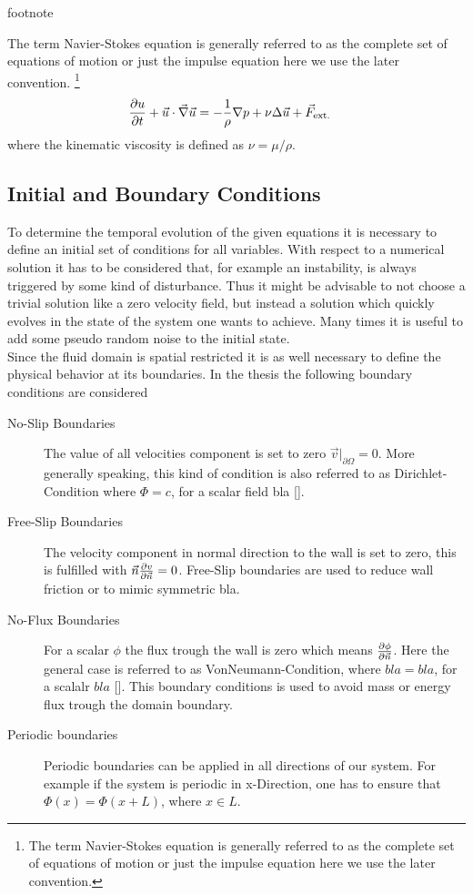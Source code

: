 footnote{The term Navier-Stokes equation is generally referred to as the complete set of equations of motion or
just the impulse equation here we use the later convention.
\footnote{The term Navier-Stokes equation is generally referred to as the complete set of equations of motion or
just the impulse equation here we use the later convention.}
\begin{align}
    \label{theorie:eqns}
    \pdn[u]{t} + \vec{u} \cdot \vec{\nabla} \vec{u} &= - \frac{1}{\rho} \nabla p + \nu \Delta \vec{u} + \vec{F}_{\text{ext.}}
\end{align}
where the kinematic viscosity is defined as $\nu = \mu/\rho$.


\subsection{Initial and Boundary Conditions}

To determine the temporal evolution of the given equations it is necessary to define an initial set of conditions for all variables.
With respect to a numerical solution it has to be considered that, for example an instability, is always triggered by some kind of disturbance.
Thus it might be advisable to not choose a trivial solution like a zero velocity field, but instead a solution which quickly evolves in the state
of the system one wants to achieve. Many times it is useful to add some pseudo random noise to the initial state.\\
Since the fluid domain is spatial restricted it is as well necessary to define the physical behavior at its boundaries.
In the thesis the following boundary conditions are considered


\begin{description}
    \item[No-Slip Boundaries] The value of all velocities component is set to zero $\vec{v}|_{\partial \Omega} = 0$.
                              More generally speaking, this kind of condition is  also referred to as Dirichlet-Condition where $\Phi=c $, for a scalar field bla [].
    \item[Free-Slip Boundaries] The velocity component in normal direction to the wall is set to zero, this is fulfilled with $\vec{n}\pdn[v]{\vec{n}} = 0$.
                                Free-Slip boundaries are used to reduce wall friction or to mimic symmetric bla.
    \item[No-Flux Boundaries] For a scalar $\phi$ the flux trough the wall is zero which means $\pdn[\phi]{\vec{n}}$.
                              Here the general case is referred to as VonNeumann-Condition, where $bla=bla$, for a scalalr $bla$  [].
                              This boundary conditions is used to avoid mass or energy flux trough the domain boundary.
    \item[Periodic boundaries] Periodic boundaries can be applied in all directions of our system. For example if the system is periodic in x-Direction,
                                one has to ensure that $\Phi(x) = \Phi(x + L)$, where $x \in L$.


\end{description}}
